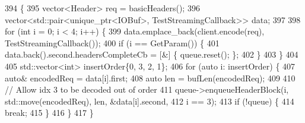 \begin{DoxyCode}
394                                       \{
395   vector<Header> req = basicHeaders();
396   vector<std::pair<unique\_ptr<IOBuf>, TestStreamingCallback>> data;
397 
398   \textcolor{keywordflow}{for} (\textcolor{keywordtype}{int} i = 0; i < 4; i++) \{
399     data.emplace\_back(client.encode(req), TestStreamingCallback());
400     \textcolor{keywordflow}{if} (i == GetParam()) \{
401       data.back().second.headersCompleteCb = [&] \{ queue.reset(); \};
402     \}
403   \}
404 
405   std::vector<int> insertOrder\{0, 3, 2, 1\};
406   \textcolor{keywordflow}{for} (\textcolor{keyword}{auto} i: insertOrder) \{
407     \textcolor{keyword}{auto}& encodedReq = data[i].first;
408     \textcolor{keyword}{auto} len = bufLen(encodedReq);
409 
410     \textcolor{comment}{// Allow idx 3 to be decoded out of order}
411     queue->enqueueHeaderBlock(i, std::move(encodedReq), len, &data[i].second,
412                              i == 3);
413     \textcolor{keywordflow}{if} (!queue) \{
414       \textcolor{keywordflow}{break};
415     \}
416   \}
417 \}
\end{DoxyCode}
